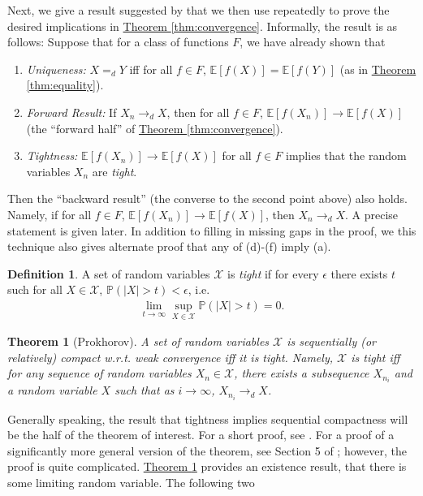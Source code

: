 \documentclass{article}
\newtheorem{theorem}{Theorem}
\theoremstyle{definition}
\newtheorem{definition}{Definition}
\renewcommand{\P}{\mathbb P}
\newcommand{\E}{\mathbb E}
\newcommand{\1}{\mathbb I}
\newcommand{\thmhref}[1]{\hyperref[#1]{Theorem \ref{#1}}}
\begin{document}
Next, we give a result suggested by \cite{billingsley2009convergence} that we
then use repeatedly to prove the desired implications in
\thmhref{thm:convergence}. Informally, the result is as
follows: Suppose that for a class of functions $F$, we have already
shown that
\begin{enumerate}
\item {\it Uniqueness:} $X =_d Y$ iff for all $f \in F$, $\E[f(X)] = \E[f(Y)]$ (as in
  \thmhref{thm:equality}).
\item {\it Forward Result:} If $X_n \to_d X$, then for all $f\in F$, $\E[f(X_n)] \to
  \E[f(X)]$ (the ``forward half'' of \thmhref{thm:convergence}).
\item {\it Tightness:} $\E[f(X_n)] \to \E[f(X)]$ for all $f \in F$ implies that the random variables $X_n$ are \emph{tight}.
\end{enumerate}
Then the ``backward result'' (the converse to the second point above)
also holds.  Namely, if for all $f \in F$, $\E[f(X_n)] \to \E[f(X)]$,
then $X_n \to_d X$.  A precise statement is given later. In addition
to filling in missing gaps in the proof, we this technique also gives
alternate proof that any of (d)-(f) imply (a).
\begin{definition}
  A set of random variables $\mathcal X$ is \emph{tight} if for every
  $\epsilon$ there exists $t$ such for all $X \in \mathcal X$, $\P(|X| >
  t) < \epsilon$, i.e.
  \begin{align*}
    \lim_{t \to \infty} \sup_{X \in \mathcal X} \P(|X| > t) = 0.
  \end{align*}
\end{definition}
\begin{theorem}[Prokhorov]
  \label{thm:prokhorov}
  A set of random variables $\mathcal X$ is sequentially (or relatively) compact
  w.r.t. weak convergence iff it is tight.  Namely, $\mathcal X$
  is tight iff for any sequence of random variables $X_n \in
  \mathcal X$, there exists a subsequence $X_{n_i}$ and a random
  variable $X$ such that as $i \to \infty$, $X_{n_i} \to_d X$.
\end{theorem}
Generally speaking, the result that tightness implies sequential
compactness will be the half of the theorem of interest.  For a short
proof, see \cite{billingsley2012probability}.  For a proof of a
significantly more general version of the theorem, see Section 5 of
\cite{billingsley2009convergence}; however, the proof is quite
complicated.  \thmhref{thm:prokhorov} provides an existence result,
that there is some limiting random variable.  The following two
\end{document}
